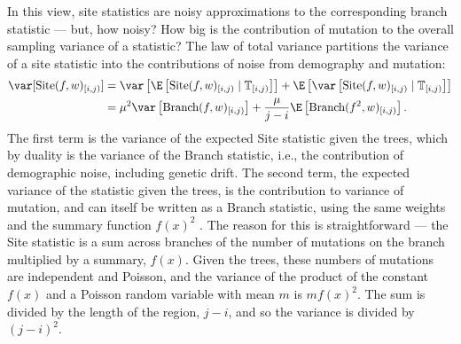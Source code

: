 \documentclass{article}
\newcommand{\branch}{\mbox{Branch}} %
\newcommand{\site}{\mbox{Site}} %
\newcommand{\given}{\;\vert\;}
\newcommand{\treeseq}{\mathbb{T}} %
\newcommand{\iw}{w} %
\begin{document}
In this view,
site statistics are noisy approximations to the corresponding branch statistic
--- but, how noisy?
How big is the contribution of mutation to the overall sampling variance of a statistic?
The law of total variance partitions the variance of a site statistic
into the contributions of noise from demography and mutation:
\begin{align*}
    \var[\site(f, \iw)_{[i,j)}]
    &=
        \var\left[ \E\left[\site(f, \iw)_{[i,j)} \given \treeseq_{[i,j)}\right] \right]
            +
        \E\left[ \var\left[\site(f, \iw)_{[i,j)} \given \treeseq_{[i,j)}\right] \right]
        \\
    &=
        \mu^2 \var\left[ \branch(f, \iw)_{[i,j)} \right]
            +
        \frac{\mu}{j-i} \E\left[ \branch(f^2, \iw)_{[i,j)} \right] .
\end{align*}
The first term is the variance of the expected Site statistic given the trees,
which by duality is the variance of the Branch statistic,
i.e., the contribution of demographic noise, including genetic drift.
The second term, the expected variance of the statistic given the trees,
is the contribution to variance of mutation,
and can itself be written as a Branch statistic,
using the same weights and the summary function $f(x)^2$
\citep[Lemma 2 in][]{ralph2019empirical}.
The reason for this is straightforward ---
the Site statistic is a sum across branches of the number of mutations on the branch
multiplied by a summary, $f(x)$.
Given the trees, these numbers of mutations are independent and Poisson,
and the variance of the product of the constant $f(x)$
and a Poisson random variable with mean $m$ is $m f(x)^2$.
The sum is divided by the length of the region, $j-i$,
and so the variance is divided by $(j-i)^2$.
\end{document}
